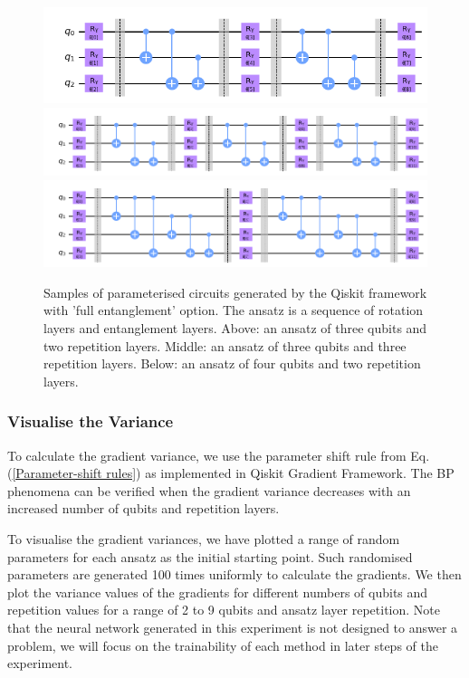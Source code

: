 \begin{figure}
    \includegraphics[width=\textwidth]{Artefact/Appendices/ansatz3-2.png}
    \includegraphics[width=\textwidth]{Artefact/Appendices/ansatz3-3.png}
    \includegraphics[width=\textwidth]{Artefact/Appendices/ansatz4-2.png}
    \caption{
        Samples of parameterised circuits generated by the Qiskit framework with 'full entanglement' option.
        The ansatz is a sequence of rotation layers and entanglement layers.
        Above: an ansatz of three qubits and two repetition layers.
        Middle: an ansatz of three qubits and three repetition layers.
        Below: an ansatz of four qubits and two repetition layers.
    }
    \label{Ansatz samples}
\end{figure}

\subsubsection{Visualise the Variance}
To calculate the gradient variance, we use the parameter shift rule from Eq. (\ref{Parameter-shift rules}) as implemented in Qiskit Gradient Framework.
The BP phenomena can be verified when the gradient variance decreases with an increased number of qubits and repetition layers.

To visualise the gradient variances, we have plotted a range of random parameters for each ansatz as the initial starting point.
Such randomised parameters are generated 100 times uniformly to calculate the gradients.
We then plot the variance values of the gradients for different numbers of qubits and repetition values for a range of 2 to 9 qubits and ansatz layer repetition.
Note that the neural network generated in this experiment is not designed to answer a problem, we will focus on the trainability of each method in later steps of the experiment.

